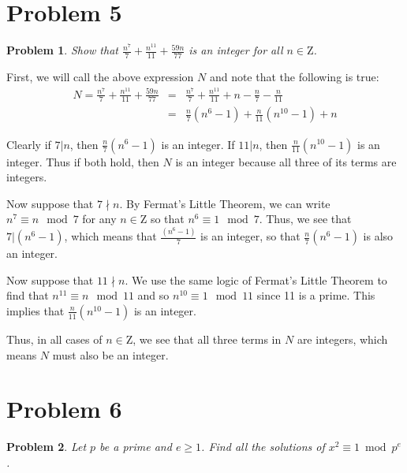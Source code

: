 \documentclass[psamsfonts]{amsart}
\newtheorem{prob}{Problem}[section]
\newenvironment{sol}{{\bfseries Solution}}{\qedsymbol}
\theoremstyle{definition}
\theoremstyle{remark}
\numberwithin{equation}{section}
\begin{document}
\section{Problem 5}

\begin{prob}
Show that $\frac{n^7}{7} + \frac{n^{11}}{11} + \frac{59n}{77}$ is an integer for all $n \in \mathrm{Z}$. 
\end{prob}

\begin{sol}
First, we will call the above expression $N$ and note that the following is true:
\begin{eqnarray}
N = \frac{n^7}{7} + \frac{n^{11}}{11} + \frac{59n}{77} &=& \frac{n^7}{7} + \frac{n^{11}}{11} + n - \frac{n}{7} - \frac{n}{11} \\
 &=& \frac{n}{7} \left( n^6 - 1 \right) + \frac{n}{11} \left( n^{10} - 1 \right) + n
\end{eqnarray}

Clearly if $7|n$, then $\frac{n}{7} \left(n^6 - 1 \right)$ is an integer. If $11|n$, then $\frac{n}{11} \left( n^{10} - 1\right)$ is an integer. Thus if both hold, then $N$ is an integer because all three of its terms are integers. 

Now suppose that $7 \nmid n$. By Fermat's Little Theorem, we can write $n^7 \equiv n \mod 7$ for any $n \in \mathrm{Z}$ so that $n^6 \equiv 1 \mod 7$. Thus, we see that $7 | (n^6 - 1)$, which means that $\frac{(n^6 - 1)}{7}$ is an integer, so that $\frac{n}{7} (n^6 - 1 )$ is also an integer. 

Now suppose that $11 \nmid n$. We use the same logic of Fermat's Little Theorem to find that $n^{11} \equiv n \mod 11$ and so $n^{10} \equiv 1 \mod 11$ since 11 is a prime. This implies that $\frac{n}{11}(n^10 - 1)$ is an integer. 

Thus, in all cases of $n \in \mathrm{Z}$, we see that all three terms in $N$ are integers, which means $N$ must also be an integer. 
\end{sol}

\section{Problem 6}

\begin{prob}
Let $p$ be a prime and $e \geq 1$. Find all the solutions of $x^2 \equiv 1 \bmod{p^e}$. 
\end{prob}
\end{document}
